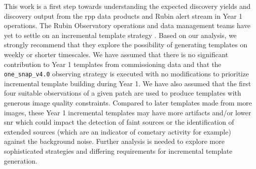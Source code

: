 \documentclass[preprintm,linenumbers]{aastex631}
\newcommand{\baseline}{\texttt{one\_snap\_v4.0}\xspace}
\begin{document}
		This work is a first step towards understanding the expected discovery yields and discovery output from the \gls*{rpp} data products and Rubin alert stream in Year 1 operations. 
		The Rubin Observatory operations and data management teams have yet to settle on an incremental template strategy \citep{DMTN-107,RTN-011}. 
		Based on our analysis, we strongly recommend that they explore the possibility of generating templates on weekly or shorter timescales.  
		We have assumed that there is no significant contribution to Year 1 templates from commissioning data and that the \baseline observing strategy is executed with no modifications to prioritize incremental template building during Year 1. 
  We have also assumed that the first four suitable observations of a given patch are used to produce templates with generous image quality constraints. 
  Compared to later templates made from more images, these Year 1 incremental templates may have more artifacts and/or lower \gls*{snr} which could impact the detection of faint sources or the identification of extended sources (which are an indicator of cometary activity for example) against the background noise.
		Further analysis is needed to explore more sophisticated strategies and differing requirements for incremental template generation. 
        
\end{document}
